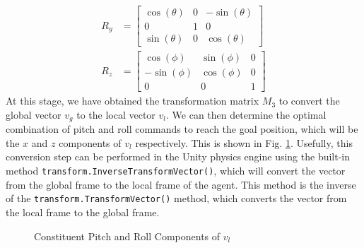 \documentclass[12pt]{article}
\begin{document}
\begin{equation}
    \begin{aligned}
        R_y &=
        \begin{bmatrix}
        \cos(\theta) & 0 & -\sin(\theta) \\
        0 & 1 & 0 \\
        \sin(\theta) & 0 & \cos(\theta)
        \end{bmatrix}
        \\
        R_z &=
        \begin{bmatrix}
        \cos(\phi) & \sin(\phi) & 0 \\
        -\sin(\phi) & \cos(\phi) & 0 \\
        0 & 0 & 1
        \end{bmatrix} 
    \end{aligned}
\end{equation}
At this stage, we have obtained the transformation matrix $M_3$ to convert the global vector $v_g$ to the local vector $v_l$. We can then determine the optimal combination of pitch and roll commands to reach the goal position, which will be the $x$ and $z$ components of $v_l$ respectively. This is shown in Fig. \ref{fig:pitch-roll}. Usefully, this conversion step can be performed in the Unity physics engine using the built-in method \verb|transform.InverseTransformVector()|, which will convert the vector from the global frame to the local frame of the agent. This method is the inverse of the \verb|transform.TransformVector()| method, which converts the vector from the local frame to the global frame.

\begin{figure}[ht]
    \centering
    \caption{Constituent Pitch and Roll Components of $v_l$}
    \label{fig:pitch-roll}
\end{figure}
\end{document}
